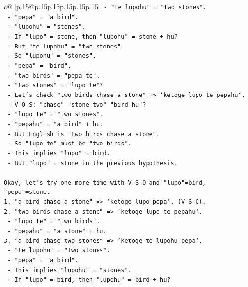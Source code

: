 \documentclass{article}
\begin{document}
{\begin{supertabular}{c@{$\;$}|p{.15\linewidth}@{}p{.15\linewidth}p{.15\linewidth}p{.15\linewidth}p{.15\linewidth}p{.15\linewidth}}
{{{\texttt{    {-} "te lupohu" = "two stones".} \\
\texttt{    {-} "pepa" = "a bird".} \\
\texttt{    {-} "lupohu" = "stones".} \\
\texttt{    {-} If "lupo" = stone, then "lupohu" = stone + hu?} \\
\texttt{    {-} But "te lupohu" = "two stones".} \\
\texttt{    {-} So "lupohu" = "stones".} \\
\texttt{    {-} "pepa" = "bird".} \\
\texttt{    {-} "two birds" = "pepa te".} \\
\texttt{    {-} "two stones" = "lupo te"?} \\
\texttt{    {-} Let's check "two birds chase a stone" => `ketoge lupo te pepahu`.} \\
\texttt{      {-} V O S: "chase" "stone two" "bird{-}hu"?} \\
\texttt{      {-} "lupo te" = "two stones".} \\
\texttt{      {-} "pepahu" = "a bird" + hu.} \\
\texttt{      {-} But English is "two birds chase a stone".} \\
\texttt{      {-} So "lupo te" must be "two birds".} \\
\texttt{      {-} This implies "lupo" = bird.} \\
\texttt{      {-} But "lupo" = stone in the previous hypothesis.} \\
\\ 
\texttt{Okay, let's try one more time with V{-}S{-}O and "lupo"=bird, "pepa"=stone.} \\
\texttt{1. "a bird chase a stone" => `ketoge lupo pepa`. (V S O).} \\
\texttt{2. "two birds chase a stone" => `ketoge lupo te pepahu`.} \\
\texttt{   {-} "lupo te" = "two birds".} \\
\texttt{   {-} "pepahu" = "a stone" + hu.} \\
\texttt{3. "a bird chase two stones" => `ketoge te lupohu pepa`.} \\
\texttt{   {-} "te lupohu" = "two stones".} \\
\texttt{   {-} "pepa" = "a bird".} \\
\texttt{   {-} This implies "lupohu" = "stones".} \\
\texttt{   {-} If "lupo" = bird, then "lupohu" = bird + hu?} \\
}}}
\end{supertabular}}
\end{document}
